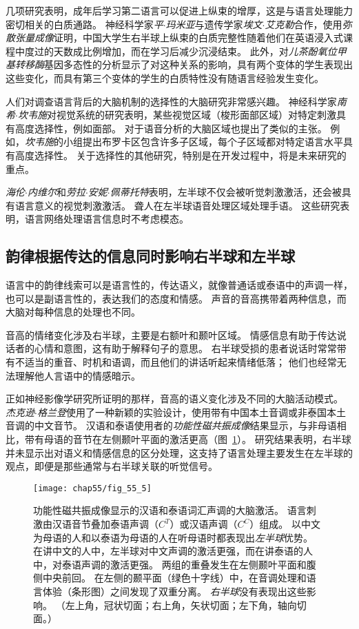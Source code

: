 几项研究表明，成年后学习第二语言可以促进上纵束的增厚，这是与语言处理能力密切相关的白质通路。
神经科学家\textit{平$\cdot$玛米亚}与遗传学家\textit{埃文$\cdot$艾克勒}合作，使用\textit{弥散张量成像}证明，中国大学生右半球上纵束的白质完整性随着他们在英语浸入式课程中度过的天数成比例增加，而在学习后减少沉浸结束。
此外，对\textit{儿茶酚氧位甲基转移酶}基因多态性的分析显示了对这种关系的影响，具有两个变体的学生表现出这些变化，而具有第三个变体的学生的白质特性没有随语言经验发生变化。


人们对调查语言背后的大脑机制的选择性的大脑研究非常感兴趣。
神经科学家\textit{南希$\cdot$坎韦施}对视觉系统的研究表明，某些视觉区域（梭形面部区域）对特定刺激具有高度选择性，例如面部。
对于语音分析的大脑区域也提出了类似的主张。
例如，\textit{坎韦施}的小组提出布罗卡区包含许多子区域，每个子区域都对特定语言水平具有高度选择性。
关于选择性的其他研究，特别是在开发过程中，将是未来研究的重点。


\textit{海伦$\cdot$内维尔}和\textit{劳拉$\cdot$安妮$\cdot$佩蒂托特}表明，左半球不仅会被听觉刺激激活，还会被具有语言意义的视觉刺激激活。
聋人在左半球语音处理区域处理手语。
这些研究表明，语言网络处理语言信息时不考虑模态。



\subsection{韵律根据传达的信息同时影响右半球和左半球}

语言中的韵律线索可以是语言性的，传达语义，就像普通话或泰语中的声调一样，也可以是副语言性的，表达我们的态度和情感。
声音的音高携带着两种信息，而大脑对每种信息的处理也不同。


音高的情绪变化涉及右半球，主要是右额叶和颞叶区域。
情感信息有助于传达说话者的心情和意图，这有助于解释句子的意思。
右半球受损的患者说话时常常带有不适当的重音、时机和语调，而且他们的讲话听起来情绪低落；
他们也经常无法理解他人言语中的情感暗示。


正如神经影像学研究所证明的那样，音高的语义变化涉及不同的大脑活动模式。
\textit{杰克逊$\cdot$格兰登}使用了一种新颖的实验设计，使用带有中国本土音调或非泰国本土音调的中文音节。
汉语和泰语使用者的\textit{功能性磁共振成像}结果显示，与非母语相比，带有母语的音节在左侧颞叶平面的激活更高（图~\ref{fig:55_5}）。
研究结果表明，右半球并未显示出对语义和情感信息的区分处理，这支持了语言处理主要发生在左半球的观点，即便是那些通常与右半球关联的听觉信号。


\begin{figure}[htbp]
	\centering
	\texttt{[image: chap55/fig\_55\_5]}
	\caption{功能性磁共振成像显示的汉语和泰语词汇声调的大脑激活。
		语言刺激由汉语音节叠加泰语声调（$ C^T $）或汉语声调（$ C^C $）组成。
		以中文为母语的人和以泰语为母语的人在听母语时都表现出\textit{左半球}优势。
		在讲中文的人中，左半球对中文声调的激活更强，而在讲泰语的人中，对泰语声调的激活更强。
		两组的重叠发生在左侧颞叶平面和腹侧中央前回。
		在左侧的颞平面（绿色十字线）中，在音调处理和语言体验（条形图）之间发现了双重分离。
		\textit{右半球}没有表现出这些影响\cite{xu2006activation}。
		（左上角，冠状切面；右上角，矢状切面；左下角，轴向切面。）}
	\label{fig:55_5}
\end{figure}


